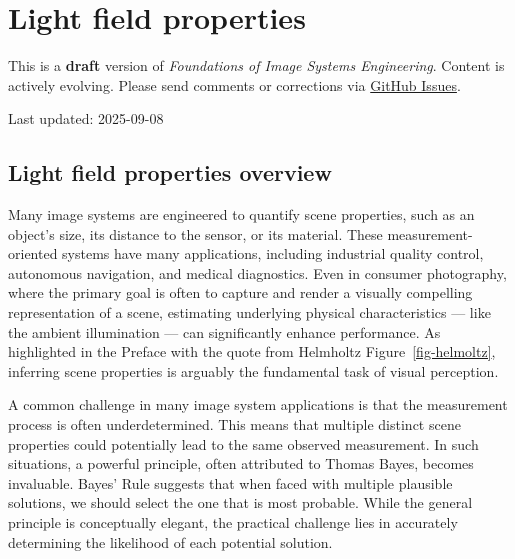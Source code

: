 \documentclass[
  letterpaper,
]{book}
\begin{document}
\chapter{Light field properties}\label{sec-lightfield-properties}

\begin{tcolorbox}[enhanced jigsaw, opacityback=0, breakable, coltitle=black, leftrule=.75mm, left=2mm, colframe=quarto-callout-warning-color-frame, opacitybacktitle=0.6, bottomtitle=1mm, bottomrule=.15mm, toprule=.15mm, title=\textcolor{quarto-callout-warning-color}{\faExclamationTriangle}\hspace{0.5em}{Work in Progress}, titlerule=0mm, toptitle=1mm, colback=white, rightrule=.15mm, colbacktitle=quarto-callout-warning-color!10!white, arc=.35mm]

This is a \textbf{draft} version of \emph{Foundations of Image Systems
Engineering}. Content is actively evolving. Please send comments or
corrections via \href{https://github.com/wandell/FISE-git/issues}{GitHub
Issues}.

Last updated: 2025-09-08

\end{tcolorbox}

\section{Light field properties
overview}\label{sec-lightfield-properties-overview}

Many image systems are engineered to quantify scene properties, such as
an object's size, its distance to the sensor, or its material. These
measurement-oriented systems have many applications, including
industrial quality control, autonomous navigation, and medical
diagnostics. Even in consumer photography, where the primary goal is
often to capture and render a visually compelling representation of a
scene, estimating underlying physical characteristics --- like the
ambient illumination --- can significantly enhance performance. As
highlighted in the Preface with the quote from Helmholtz
Figure~\ref{fig-helmoltz}, inferring scene properties is arguably the
fundamental task of visual perception.

A common challenge in many image system applications is that the
measurement process is often underdetermined. This means that multiple
distinct scene properties could potentially lead to the same observed
measurement. In such situations, a powerful principle, often attributed
to Thomas Bayes, becomes invaluable. Bayes' Rule suggests that when
faced with multiple plausible solutions, we should select the one that
is most probable. While the general principle is conceptually elegant,
the practical challenge lies in accurately determining the likelihood of
each potential solution.
\end{document}
